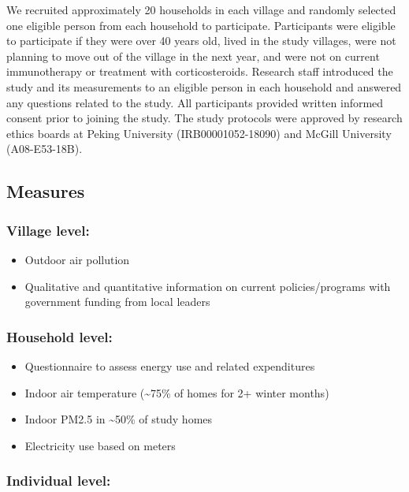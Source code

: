 \documentclass[
  letterpaper,
  DIV=11,
  numbers=noendperiod]{scrartcl}
\providecommand{\tightlist}{%
  \setlength{\itemsep}{0pt}\setlength{\parskip}{0pt}}\usepackage{longtable,booktabs,array}
\begin{document}
We recruited approximately 20 households in each village and randomly
selected one eligible person from each household to participate.
Participants were eligible to participate if they were over 40 years
old, lived in the study villages, were not planning to move out of the
village in the next year, and were not on current immunotherapy or
treatment with corticosteroids. Research staff introduced the study and
its measurements to an eligible person in each household and answered
any questions related to the study. All participants provided written
informed consent prior to joining the study. The study protocols were
approved by research ethics boards at Peking University
(IRB00001052-18090) and McGill University (A08-E53-18B).

\subsection{Measures}\label{measures}

\subsubsection{Village level:}\label{village-level}

\begin{itemize}
\tightlist
\item
  Outdoor air pollution
\item
  Qualitative and quantitative information on current policies/programs
  with government funding from local leaders
\end{itemize}

\subsubsection{Household level:}\label{household-level}

\begin{itemize}
\tightlist
\item
  Questionnaire to assess energy use and related expenditures
\item
  Indoor air temperature (\textasciitilde75\% of homes for 2+ winter
  months)
\item
  Indoor PM2.5 in \textasciitilde50\% of study homes
\item
  Electricity use based on meters
\end{itemize}

\subsubsection{Individual level:}\label{individual-level}
\end{document}
